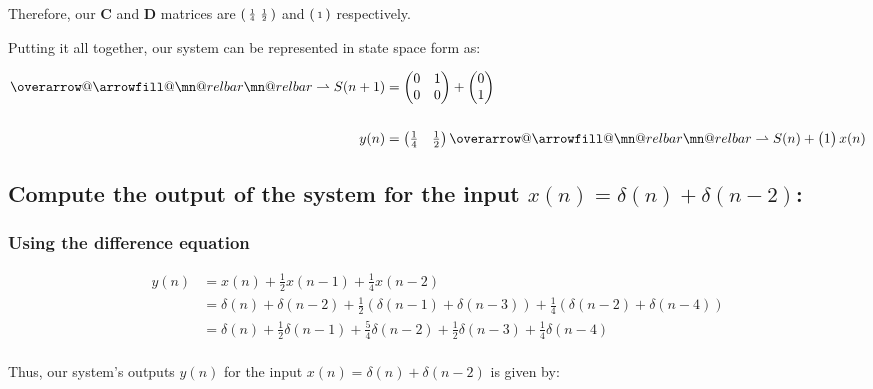 \documentclass{article}
\makeatletter
\renewcommand{\thesubsection}{\thesection.\alph{subsection}}
\renewcommand{\thesubsubsection}{\thesection.\alph{subsection}.\Roman{subsubsection}}
\DeclareRobustCommand{\overrightharpoon}{\mathpalette{\overarrow@\rightharpoonfill@}}
\def\rightharpoonfill@{\arrowfill@\mn@relbar\mn@relbar\rightharpoonup}
\makeatother
\begin{document}
Therefore, our $\boldsymbol{C}$ and $\boldsymbol{D}$ matrices are $\begin{psmallmatrix} \frac{1}{4} & \frac{1}{2} \end{psmallmatrix}$ and $\begin{psmallmatrix} 1 \end{psmallmatrix}$ respectively.

Putting it all together, our system can be represented in state space form as:

\begin{align*}
	\overrightharpoon{S(n + 1)} &= \begin{pmatrix} 0 & 1 \\ 0 & 0 \end{pmatrix} + \begin{pmatrix} 0 \\ 1 \end{pmatrix} \\\\
	y(n) &= \begin{pmatrix} \frac{1}{4} & \frac{1}{2} \end{pmatrix}\overrightharpoon{S(n)} + \begin{pmatrix} 1 \end{pmatrix}x(n)
\end{align*}

\subsection[~\thesubsection]{Compute the output of the system for the input $x(n) = \delta(n) + \delta(n - 2)$:}

\subsubsection[~\thesubsubsection]{Using the difference equation}

\begin{align*}
	y(n) &= x(n) + \frac{1}{2}x(n - 1) + \frac{1}{4}x(n - 2) \\
	&= \delta(n) + \delta(n - 2) + \frac{1}{2}(\delta(n - 1) + \delta(n - 3)) + \frac{1}{4}(\delta(n - 2) + \delta(n - 4)) \\
	&= \delta(n) + \frac{1}{2}\delta(n - 1) + \frac{5}{4}\delta(n - 2) + \frac{1}{2}\delta(n - 3) + \frac{1}{4}\delta(n - 4) \\
\end{align*}

Thus, our system's outputs $y(n)$ for the input $x(n) = \delta(n) + \delta(n - 2)$ is given by:
\end{document}
